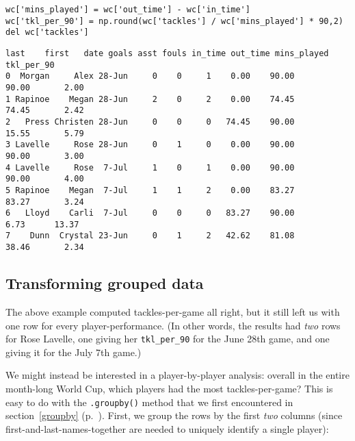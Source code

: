 \begin{Verbatim}[fontsize=\small,samepage=true,frame=single,framesep=3mm]
wc['mins_played'] = wc['out_time'] - wc['in_time']
wc['tkl_per_90'] = np.round(wc['tackles'] / wc['mins_played'] * 90,2)
del wc['tackles']
\end{Verbatim}
\vspace{-.2in}

\begin{Verbatim}[fontsize=\footnotesize,samepage=true,frame=leftline,framesep=5mm,framerule=1mm]
     last    first   date goals asst fouls in_time out_time mins_played tkl_per_90
0  Morgan     Alex 28-Jun     0    0     1    0.00    90.00       90.00       2.00
1 Rapinoe    Megan 28-Jun     2    0     2    0.00    74.45       74.45       2.42
2   Press Christen 28-Jun     0    0     0   74.45    90.00       15.55       5.79
3 Lavelle     Rose 28-Jun     0    1     0    0.00    90.00       90.00       3.00
4 Lavelle     Rose  7-Jul     1    0     1    0.00    90.00       90.00       4.00
5 Rapinoe    Megan  7-Jul     1    1     2    0.00    83.27       83.27       3.24
6   Lloyd    Carli  7-Jul     0    0     0   83.27    90.00        6.73      13.37
7    Dunn  Crystal 23-Jun     0    1     2   42.62    81.08       38.46       2.34
\end{Verbatim}

\subsection{Transforming grouped data}

The above example computed tackles-per-game all right, but it still left us
with one row for every player-performance. (In other words, the results had
\textit{two} rows for Rose Lavelle, one giving her \texttt{tkl\_per\_90} for
the June 28th game, and one giving it for the July 7th game.)


We might instead be interested in a player-by-player analysis: overall in the
entire month-long World Cup, which players had the most tackles-per-game? This
is easy to do with the \texttt{.groupby()} method that we first encountered in
section~\ref{groupby} (p.~\pageref{groupby}). First, we group the rows by the
first \textit{two} columns (since first-and-last-names-together are needed to
uniquely identify a single player):


